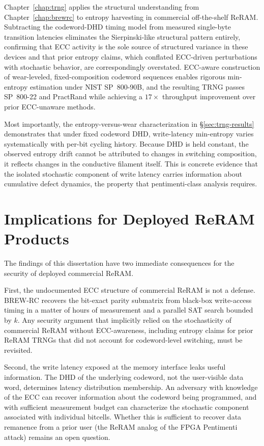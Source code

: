 Chapter~\ref{chap:trng} applies the structural understanding from
Chapter~\ref{chap:brewrc} to entropy harvesting in commercial
off-the-shelf ReRAM. Subtracting the codeword-DHD timing model from
measured single-byte transition latencies eliminates the Sierpinski-like
structural pattern entirely, confirming that ECC activity is the sole
source of structured variance in these devices and that prior entropy
claims, which conflated ECC-driven perturbations with stochastic
behavior, are correspondingly overstated. ECC-aware construction of
wear-leveled, fixed-composition codeword sequences enables rigorous
min-entropy estimation under NIST SP~800-90B, and the resulting TRNG
passes SP~800-22 and PractRand while achieving a $17\times$ throughput
improvement over prior ECC-unaware methods.

Most importantly, the entropy-versus-wear characterization in
\S\ref{sec:trng-results} demonstrates that under fixed codeword DHD,
write-latency min-entropy varies systematically with per-bit cycling
history. Because DHD is held constant, the observed entropy drift cannot
be attributed to changes in switching composition, it reflects changes
in the conductive filament itself. This is concrete evidence that the
isolated stochastic component of write latency carries information about
cumulative defect dynamics, the property that pentimenti-class analysis
requires.

\section{Implications for Deployed ReRAM Products}

The findings of this dissertation have two immediate consequences for
the security of deployed commercial ReRAM.

First, the undocumented ECC structure of commercial ReRAM is not a
defense. BREW-RC recovers the bit-exact parity submatrix from black-box
write-access timing in a matter of hours of measurement and a parallel
SAT search bounded by $k$. Any security argument that implicitly relied
on the stochasticity of commercial ReRAM without ECC-awareness,
including entropy claims for prior ReRAM TRNGs that did not account for
codeword-level switching, must be revisited.

Second, the write latency exposed at the memory interface leaks useful
information. The DHD of the underlying codeword, not the user-visible
data word, determines latency distribution membership. An adversary with
knowledge of the ECC can recover information about the codeword being
programmed, and with sufficient measurement budget can characterize the
stochastic component associated with individual bitcells. Whether this
is sufficient to recover data remanence from a prior user (the ReRAM
analog of the FPGA Pentimenti attack) remains an open question.

